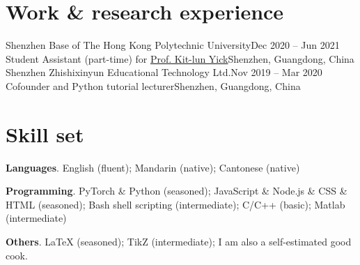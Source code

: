 \documentclass[letterpaper,11pt]{article}
\begin{document}
    \section{Work \& research experience}

    \resumeColumnsStart
        \resumeEntry
            {Shenzhen Base of The Hong Kong Polytechnic University}{Dec 2020 -- Jun 2021}
            {Student Assistant (part-time) for \href{https://research.polyu.edu.hk/en/persons/kit-lun-yick}{Prof. Kit-lun Yick}}{Shenzhen, Guangdong, China}
        \resumeEntry
            {Shenzhen Zhishixinyun Educational Technology Ltd.}{Nov 2019 -- Mar 2020}
            {Cofounder and Python tutorial lecturer}{Shenzhen, Guangdong, China}
    \resumeColumnsEnd

    \section{Skill set}

    \begin{resumeItemize}
        \item \textbf{Languages}. English (fluent); Mandarin (native); Cantonese (native)
        \item \textbf{Programming}. PyTorch \& Python (seasoned); JavaScript \& Node.js \& CSS \& HTML (seasoned); Bash shell scripting (intermediate); C/C++ (basic); Matlab (intermediate)
        \item \textbf{Others}. LaTeX (seasoned); TikZ (intermediate); I am also a self-estimated good cook.
    \end{resumeItemize}
\end{document}
